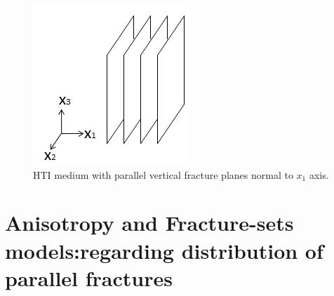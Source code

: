 \documentclass[review,authoryear]{elsarticle}
\begin{document}
\begin{figure}
\includegraphics[scale=0.8]{./figures/HTI.jpg}
\centering
\caption{HTI medium with parallel vertical fracture planes normal to $x_1$ axis.}\label{FIG:HTI}
\end{figure}

\section{Anisotropy and Fracture-sets models:regarding distribution of parallel fractures}
\end{document}

